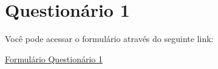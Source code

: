 \chapter{Questionário 1}

\label{chap:questionario1}

Você pode acessar o formulário através do seguinte link:

\begin{center}
  \href{https://docs.google.com/forms/d/e/1FAIpQLScxMwovu4MMntpGwrgEj_7y-Tu_kcfUxXKRmZChxumTQQ31vg/viewform?usp=dialog}
       {Formulário Questionário 1}
\end{center}

